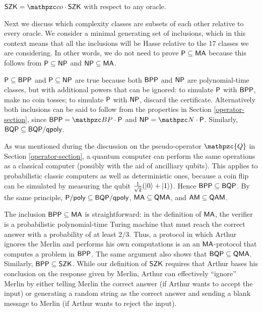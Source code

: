 \begin{theorem}
$\msf{SZK}=\cco\cdot\msf{SZK}$ with respect to any oracle.
\end{theorem}

Next we discuss which complexity classes are subsets of each other relative to
every oracle. We consider a minimal generating set of inclusions, which in this
context means that all the inclusions will be Hasse relative to the 17 classes
we are considering. In other words, we do not need to prove
$\mathsf{P}\subseteq\mathsf{MA}$ because this follows from $\mathsf{P}\subseteq\mathsf{NP}$ and
$\mathsf{NP}\subseteq\mathsf{MA}$.

$\mathsf{P}\subseteq\mathsf{BPP}$ and $\mathsf{P}\subseteq\mathsf{NP}$ are true because both
$\mathsf{BPP}$ and $\mathsf{NP}$ are polynomial-time classes, but with additional
powers that can be ignored: to simulate $\mathsf{P}$ with $\mathsf{BPP}$, make no coin
tosses; to simulate $\mathsf{P}$ with $\mathsf{NP}$, discard the certificate.
Alternatively both inclusions can be said to follow from the properties in
Section \ref{operator-section}, since $\msf{BPP}=\cBP\cdot\sP$ and
$\msf{NP}=\cN\cdot\sP$. Similarly, 
$\mathsf{BQP}\subseteq\mathsf{BQP}/\mathsf{qpoly}$.

As was mentioned during the discussion on the pseudo-operator $\mathpzc{Q}$ in
Section \ref{operator-section}, a quantum computer can perform the same
operations as a classical computer (possibly with the aid of ancilliary qubits).
This applies to probabilistic classic computers as well as deterministic ones,
because a coin flip can be simulated by measuring the qubit
$\frac{1}{\sqrt{2}}(|0\rangle+|1\rangle)$. Hence $\mathsf{BPP}\subseteq\mathsf{BQP}$. By 
the same principle, $\mathsf{P}/\mathsf{poly}\subseteq\mathsf{BQP}/\mathsf{qpoly}$, 
$\mathsf{MA}\subseteq\mathsf{QMA}$, and $\mathsf{AM}\subseteq\mathsf{QAM}$.

The inclusion $\mathsf{BPP}\subseteq\mathsf{MA}$
is straightforward: in the definition of $\mathsf{MA}$, the
verifier is a probabilistic polynomial-time Turing machine that must reach the
correct answer with a probability of at least $2/3$. Thus, a protocol in which
Arthur ignores the Merlin and performs his own computations is an
an $\mathsf{MA}$-protocol that computes a problem in
$\mathsf{BPP}$. The same argument also shows that $\mathsf{BQP}\subseteq\mathsf{QMA}$. 
Similarly, $\mathsf{BPP}\subseteq\mathsf{SZK}$. While our definition of $\mathsf{SZK}$ 
requires that Arthur bases his conclusion on the response given by Merlin, Arthur 
can effectively ``ignore'' Merlin by either telling Merlin the correct answer (if 
Arthur wants to accept the input) or generating a random string as the correct 
answer and sending a blank message to Merlin (if Arthur wants to reject the input).

